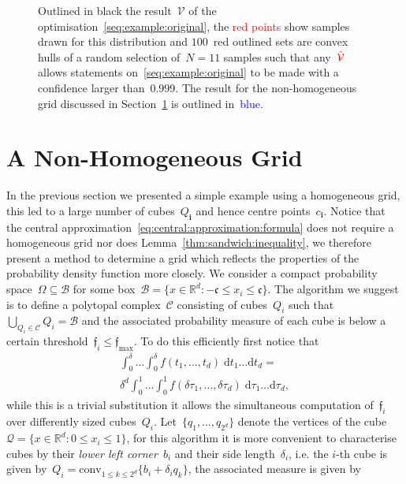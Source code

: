 \documentclass[letterpaper, 10pt, conference]{ieeeconf} %
\providecommand{\conv}{\text{conv}}
\providecommand{\bfa}[1]{\mathbf{#1}}
\begin{document}
\begin{figure}\centering

\caption{Outlined in black the result~$\mathcal V$ of the optimisation~\eqref{seq:example:original}, the \textcolor{red}{red points} show samples drawn for this distribution and $100$~red outlined sets are convex hulls of a random selection of~$N=11$ samples such that any~$\textcolor{red}{\hat{\mathcal V}}$ allows statements on~\eqref{seq:example:original} to be made with a confidence larger than~$0.999$.
%
The result for the non-homogeneous grid discussed in Section~\ref{sec:improved:grid} is outlined in~\textcolor{blue}{blue}.}
\label{fig:example:in:comparison}
\end{figure}
%
%
%
\section{A Non-Homogeneous Grid}\label{sec:improved:grid}
%
%
%
\noindent In the previous section we presented a simple example using a homogeneous grid, this led to a large number of cubes~$Q_\bfa{i}$ and hence centre points~$c_\bfa{i}$.
%
Notice that the central approximation~\eqref{eq:central:approximation:formula} does not require a homogeneous grid nor does Lemma~\ref{thm:sandwich:inequality}, we therefore present a method to determine a grid which reflects the properties of the probability density function more closely.
%
We consider a compact probability space~$\Omega\subseteq\mathcal B$ for some box~$\mathcal B=\{x\in\mathbb R^d:-\mathfrak{c}\leq x_i\leq \mathfrak{c}\}$.
%
The algorithm we suggest is to define a polytopal complex~$\mathcal C$ consisting of cubes~$Q_i$ such that~$\bigcup_{Q_i\in\mathcal C}Q_i=\mathcal B$ and the associated probability measure of each cube is below a certain threshold~$\mathfrak{f}_i\leq\mathfrak{f}_{\max}$.
%
To do this efficiently first notice that
\begin{multline*}
\int_0^{\delta}\dots\int_0^\delta f(t_1,\dots,t_d)\; \mathrm d t_1\dots \mathrm dt _d = \\ \delta^d\int_0^1\dots\int_0^1f(\delta\tau_1,\dots,\delta\tau_d)
\; \mathrm d\tau_1\dots \mathrm d\tau_d, 
\end{multline*}
while this is a trivial substitution it allows the simultaneous computation of~$\mathfrak{f}_i$ over differently sized cubes~$Q_i$.
%
Let~$\{q_1,\dots,q_{2^d}\}$ denote the vertices of the cube~$\mathcal Q=\{x\in\mathbb R^d: 0\leq x_i\leq 1\}$, for this algorithm it is more convenient to characterise cubes by their \emph{lower left corner}~$b_i$ and their side length~$\delta_i$, i.e. the $i$-th cube is given by~$Q_i=\conv_{1\leq k\leq2^d}\{b_i+\delta_i q_k\}$, the associated measure is given by
\end{document}
